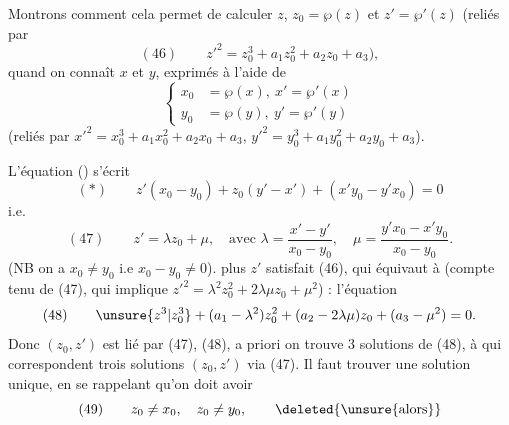 
Montrons comment cela permet de calculer $z$, 
$z_0=\wp(z)$ et $z'=\wp'(z)$ (reliés par
\[
(46)\qquad z'^2=z_0^3+a_1z_0^2+a_2z_0+a_3),
\]
quand on connaît $x$ et $y$, exprimés à l'aide de
\[
\left\{\begin{aligned}
x_0&=\wp(x),\ x'=\wp'(x)\\
y_0&=\wp(y),\ y'=\wp'(y)
\end{aligned}\right.
\]
(reliés par $x'^2=x_0^3+a_1x_0^2+a_2x_0+a_3$, $y'^2=y_0^3+a_1y_0^2+a_2y_0+a_3$).

L'équation () s'écrit
\[
(*)\qquad z'(x_0-y_0)+z_0(y'-x')+(x'y_0-y'x_0)=0
\]
i.e.
\[
(47)\qquad z'=\lambda z_0+\mu,\quad\text{avec }\lambda=\frac{x'-y'}{x_0-y_0},\quad
\mu=\frac{y'x_0-x'y_0}{x_0-y_0}.
\]
 (NB on a $x_0\ne y_0$ i.e $x_0-y_0\ne0$).
 plus $z'$ satisfait (46), qui équivaut à
 (compte tenu de (47), qui implique
$z'^2=\lambda^2z_0^2+2\lambda\mu z_0+\mu^2$) : l'équation
\[
(48)\qquad \unsure{z^3|z_0^3}+(a_1-\lambda^2)z_0^2+(a_2-2\lambda\mu)z_0+(a_3-\mu^2)=0.
\]
Donc $(z_0,z')$ est lié par (47), (48), a priori on trouve 3 solutions
 de (48), à qui correspondent trois solutions $(z_0,z')$ via (47).
Il faut trouver une solution unique, en se rappelant qu'on doit avoir
\[
(49)\qquad z_0\ne x_0,\quad z_0\ne y_0,\qquad\deleted{\text{\unsure{alors}}}
\]
